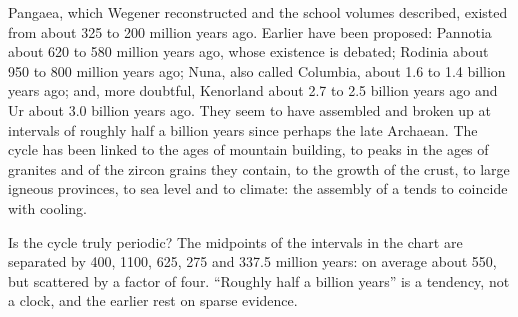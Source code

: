 Pangaea, which Wegener reconstructed and the school volumes described, existed from about 325
to 200 million years ago. Earlier  have been proposed: Pannotia about 620 to
580 million years ago, whose existence is debated; Rodinia about 950 to 800 million years ago;
Nuna, also called Columbia, about 1.6 to 1.4 billion years ago; and, more doubtful, Kenorland
about 2.7 to 2.5 billion years ago and Ur about 3.0 billion years ago. They seem to have
assembled and broken up at intervals of roughly half a billion years since perhaps the late
Archaean. The cycle has been linked to the ages of mountain building, to peaks in the ages of
granites and of the zircon grains they contain, to the growth of the crust, to large igneous
provinces, to sea level and to climate: the assembly of a  tends to coincide
with cooling.

\begin{omfigure}
\centering
\par{}
\end{omfigure}

Is the cycle truly periodic? The midpoints of the intervals in the chart are separated by 400,
1100, 625, 275 and 337.5 million years: on average about 550, but scattered by a factor of
four. ``Roughly half a billion years'' is a tendency, not a clock, and the earlier
 rest on sparse evidence.

